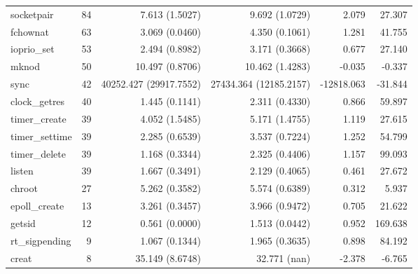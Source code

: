 \begin{longtable}{>{\ttfamily}lrrrrr}
                     socketpair &         84 &              7.613 (1.5027) &            9.692 (1.0729) &           2.079 &       27.307 \\
                       fchownat &         63 &              3.069 (0.0460) &            4.350 (0.1061) &           1.281 &       41.755 \\
                    ioprio\_set &         53 &              2.494 (0.8982) &            3.171 (0.3668) &           0.677 &       27.140 \\
                          mknod &         50 &             10.497 (0.8706) &           10.462 (1.4283) &          -0.035 &       -0.337 \\
                           sync &         42 &      40252.427 (29917.7552) &    27434.364 (12185.2157) &      -12818.063 &      -31.844 \\
                  clock\_getres &         40 &              1.445 (0.1141) &            2.311 (0.4330) &           0.866 &       59.897 \\
                  timer\_create &         39 &              4.052 (1.5485) &            5.171 (1.4755) &           1.119 &       27.615 \\
                 timer\_settime &         39 &              2.285 (0.6539) &            3.537 (0.7224) &           1.252 &       54.799 \\
                  timer\_delete &         39 &              1.168 (0.3344) &            2.325 (0.4406) &           1.157 &       99.093 \\
                         listen &         39 &              1.667 (0.3491) &            2.129 (0.4065) &           0.461 &       27.672 \\
                         chroot &         27 &              5.262 (0.3582) &            5.574 (0.6389) &           0.312 &        5.937 \\
                  epoll\_create &         13 &              3.261 (0.3457) &            3.966 (0.9472) &           0.705 &       21.622 \\
                         getsid &         12 &              0.561 (0.0000) &            1.513 (0.0442) &           0.952 &      169.638 \\
                 rt\_sigpending &          9 &              1.067 (0.1344) &            1.965 (0.3635) &           0.898 &       84.192 \\
                          creat &          8 &             35.149 (8.6748) &              32.771 (nan) &          -2.378 &       -6.765 \\
\end{longtable}
